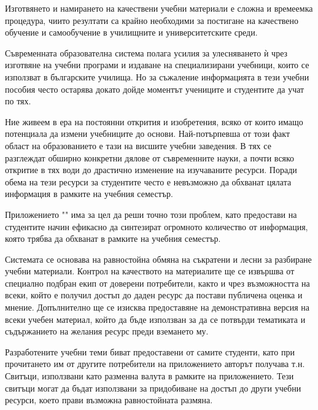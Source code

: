 
Изготвянето и намирането на качествени учебни материали
е сложна и времеемка процедура, чиито резултати са крайно
необходими за постигане на качествено обучение и 
самообучение в училищните и университетските среди.

Съвременната образователна система полага усилия за
улесняването ѝ чрез изготвяне на учебни програми и
издаване на специализирани учебници, които се използват
в българските училища. Но за съжаление информацията в
тези учебни пособия често остарява докато дойде моментът
учениците и студентите да учат по тях.

Ние живеем в ера на постоянни открития и изобретения,
всяко от които имащо потенциала да измени учебниците
до основи. Най-потърпевша от този факт област на
образованието е тази на висшите учебни заведения.
В тях се разглеждат обширно конкретни дялове от
съвременните науки, а почти всяко откритие в тях води
до драстично изменение на изучаваните ресурси.
Поради обема на тези ресурси за студентите често е
невъзможно да обхванат цялата информация в рамките на
учебния семестър.


Приложението "\appTitle{}" има за цел да реши точно този
проблем, като предостави на студентите начин ефикасно
да синтезират огромното количество от информация, която
трябва да обхванат в рамките на учебния семестър.

Системата се основава на равностойна обмяна на съкратени
и лесни за разбиране учебни материали. Контрол на
качеството на материалите ще се извършва от специално
подбран екип от доверени потребители, както и чрез
възможността на всеки, който е получил достъп до даден
ресурс да постави публичена оценка и мнение.
Допълнително ще се изисква предоставяне на демонстративна
версия на всеки учебен материал, който да бъде използван
за да се потвърди тематиката и съдържанието на желания
ресурс преди вземането му.


Разработените учебни теми биват предоставени от самите
студенти, като при прочитането им от другите потребители
на приложението авторът получава т.н. Свитъци,
използвани като разменна валута в рамките
на приложението. Тези свитъци могат да бъдат използвани
за придобиване на достъп до други учебни ресурси, което
прави възможна равностойната размяна.

